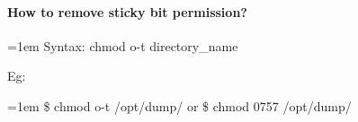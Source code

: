 \begin{flushleft}
\paragraph{How to remove sticky bit permission?}
\bigskip
\begin{tcolorbox}[breakable,notitle,boxrule=0pt,colback=pink,colframe=pink]
	\color{black}
	\font=1em
	Syntax: chmod o-t directory\_name
	\font=4pt
\end{tcolorbox}
Eg:
\begin{tcolorbox}[breakable,notitle,boxrule=-0pt,colback=black,colframe=black]
	\color{green}
	\font=1em
	\$ chmod o-t /opt/dump/
	\newline
	or
	\newline
	\$ chmod 0757 /opt/dump/
	\font=4pt
\end{tcolorbox}
	
	
\end{flushleft}

\newpage

